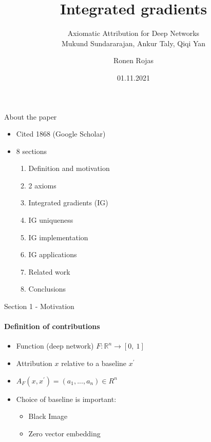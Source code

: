 \documentclass[serif]{beamer}
\title{ Integrated gradients }
\subtitle{Axiomatic Attribution for Deep Networks\\ Mukund Sundararajan, Ankur Taly, Qiqi Yan }
\author{Ronen Rojas}
\date{01.11.2021}
\begin{document}
\maketitle

\begin{frame}{About the paper}
\begin{itemize}
	\item Cited 1868 (Google Scholar) 
	\item 8 sections
	\begin{enumerate}
		\item Definition and motivation
		\item 2 axioms 
		\item Integrated gradients (IG)
		\item IG uniqueness 
		\item IG implementation
		\item IG applications
		\item Related work
		\item Conclusions
	\end{enumerate}
\end{itemize}
\end{frame}

\begin{frame}{Section 1 - Motivation}
\framesubtitle{Definition of contributions}
\begin{itemize}
    \item Function (deep network) $F: \mathbb{R}^n \rightarrow [0, ~1]$
    \item Attribution $x$ relative to a baseline $x^\prime$ 
	\item $A_F(x, x^\prime)= (a_1, ... , a_n) \in R^n$
	\item Choice of baseline is important:
	\begin{itemize}
			\item Black Image
			\item Zero vector embedding 
	\end{itemize}
\end{itemize}
\end{frame}
\end{document}
